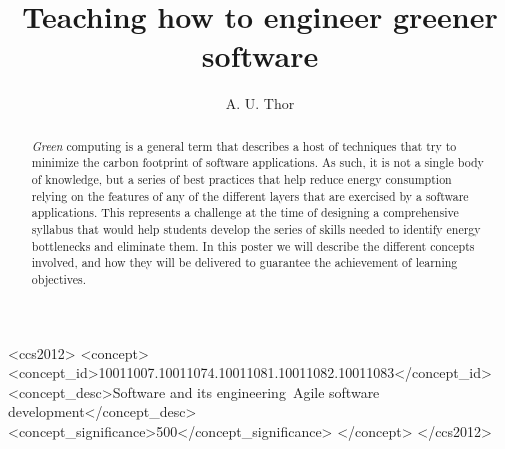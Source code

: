 \documentclass[sigconf]{acmart}
\begin{document}
\title{Teaching how to engineer greener software}

%
\author{A. U. Thor}

\renewcommand{\shortauthors}{A. U. Thor}

\begin{abstract}
{\em Green} computing is a general term that describes a host of techniques that
try to minimize the carbon footprint of software applications. As such, it is
not a single body of knowledge, but a series of best practices that help reduce
energy consumption relying on the features of any of the different layers that
are exercised by a software applications. This represents a challenge at the
time of designing a comprehensive syllabus that would help students develop the
series of skills needed to identify energy bottlenecks and eliminate them. In
this poster we will describe the different concepts involved, and how they will
be delivered to guarantee the achievement of learning objectives.
\end{abstract}

\begin{CCSXML}
<ccs2012>
   <concept>
       <concept_id>10011007.10011074.10011081.10011082.10011083</concept_id>
       <concept_desc>Software and its engineering~Agile software development</concept_desc>
       <concept_significance>500</concept_significance>
       </concept>
 </ccs2012>
\end{CCSXML}





\maketitle
\end{document}

